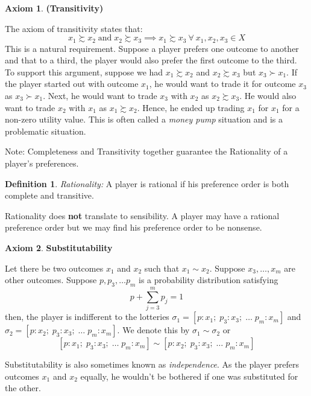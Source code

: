 \documentclass{article}
\theoremstyle{definition}
\newtheorem{defn}[theorem]{Definition}
\newtheorem{ax}{Axiom}
\begin{document}
\begin{ax}
\textbf{(Transitivity)} \smallskip

The axiom of transitivity states that:
\[
    x_1 \succsim x_2 \; \text{and} \; x_2 \succsim x_3 \implies x_1 \succsim x_3 \: \forall \: x_1, x_2, x_3 \in X
\]
This is a natural requirement. Suppose a player prefers one outcome to another and that to a third, the player would also prefer the first outcome to the third. To support this argument, suppose we had $x_1 \succsim x_2$ and $x_2 \succsim x_3$ but $x_3 \succ x_1$. If the player started out with outcome $x_1$, he would want to trade it for outcome $x_3$ as $x_3 \succ x_1$. Next, he would want to trade $x_3$ with $x_2$ as $x_2 \succsim x_3$. He would also want to trade $x_2$ with $x_1$ as $x_1 \succsim x_2$. Hence, he ended up trading $x_1$ for $x_1$ for a non-zero utility value. This is often called a \textit{money pump} situation and is a problematic situation.
\end{ax} \smallskip

Note: Completeness and Transitivity together guarantee the Rationality of a player's preferences.

\begin{defn}
    \textit{Rationality:} A player is rational if his preference order is both complete and transitive.
\end{defn}

Rationality does \textbf{not} translate to sensibility. A player may have a rational preference order but we may find his preference order to be nonsense.

\begin{ax}
\textbf{Substitutability}

Let there be two outcomes $x_1$ and $x_2$ such that $x_1 \sim x_2$. Suppose $x_3, \ldots , x_m$ are other outcomes. Suppose $p, p_3, \ldots p_m$ is a probability distribution satisfying
\[
    p + \sum_{j=3}^{m} p_j = 1
\]
then, the player is indifferent to the lotteries $\sigma_1 = [p : x_1; \; p_3 : x_3; \; \ldots \; p_m : x_m]$ and $\sigma_2 = [p : x_2; \; p_3 : x_3; \; \ldots \; p_m : x_m]$. We denote this by $\sigma_1 \sim \sigma_2$ or 
\[
     [p : x_1; \; p_3 : x_3; \; \ldots \; p_m : x_m] \sim  [p : x_2; \; p_3 : x_3; \; \ldots \; p_m : x_m]
\]

Substitutability is also sometimes known as \textit{independence}. As the player prefers outcomes $x_1$ and $x_2$ equally, he wouldn't be bothered if one was substituted for the other.
\end{ax}
\end{document}
